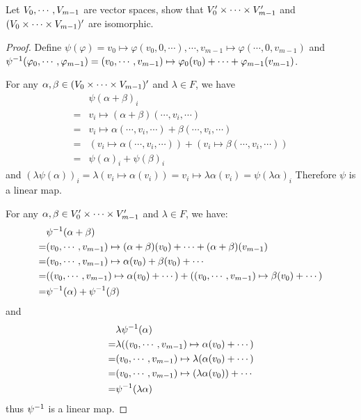 \documentclass[../main.tex]{subfiles}
\begin{document}
\begin{exercise}
  Let $V_0 , \cdots , V_{m - 1}$ are vector spaces, show that $V^\prime_0 \times \cdots \times V^\prime_{m - 1}$ and
  $(V_0 \times \cdots \times V_{m - 1})^\prime$ are isomorphic.
\end{exercise}
\begin{proof}
  Define $\psi(\varphi) = v_0 \mapsto \varphi(v_0, 0, \cdots), \cdots, v_{m - 1} \mapsto \varphi(\cdots, 0, v_{m - 1})$
  and \\
  $\psi^{-1}(\varphi_0 , \cdots , \varphi_{m - 1}) = (v_0 , \cdots , v_{m - 1}) \mapsto \varphi_0(v_0) + \cdots + \varphi_{m - 1}(v_{m - 1})$.

  For any $\alpha, \beta \in (V_0 \times \cdots \times V_{m - 1})^\prime$ and $\lambda \in F$,
  we have
  \begin{align*}
     & \psi(\alpha + \beta)_i \\
    =& v_i \mapsto (\alpha + \beta)(\cdots, v_i, \cdots) \\
    =& v_i \mapsto \alpha(\cdots, v_i, \cdots) + \beta(\cdots, v_i, \cdots) \\
    =& (v_i \mapsto \alpha(\cdots, v_i, \cdots)) + (v_i \mapsto \beta(\cdots, v_i, \cdots)) \\
    =& \psi(\alpha)_i + \psi(\beta)_i
  \end{align*}
  and $(\lambda \psi(\alpha))_i = \lambda (v_i \mapsto \alpha(v_i)) = v_i \mapsto \lambda \alpha(v_i) = \psi(\lambda \alpha)_i$
  Therefore $\psi$ is a linear map.

  For any $\alpha, \beta \in V^\prime_0 \times \cdots \times V^\prime_{m - 1}$ and $\lambda \in F$,
  we have:
  \begin{align*}
   & \psi^{-1}(\alpha + \beta) \\
  =& (v_0 , \cdots , v_{m - 1}) \mapsto (\alpha + \beta)(v_0) + \cdots + (\alpha + \beta)(v_{m - 1}) \\
  =& (v_0 , \cdots , v_{m - 1}) \mapsto \alpha(v_0) + \beta(v_0) + \cdots \\
  =& ((v_0 , \cdots , v_{m - 1}) \mapsto \alpha(v_0) + \cdots) + ((v_0 , \cdots , v_{m - 1}) \mapsto \beta(v_0) + \cdots) \\
  =& \psi^{-1}(\alpha) + \psi^{-1}(\beta)
  \end{align*}
  and
  \begin{align*}
     & \lambda\psi^{-1}(\alpha) \\
    =& \lambda ((v_0 , \cdots , v_{m - 1}) \mapsto \alpha(v_0) + \cdots) \\
    =& (v_0 , \cdots , v_{m - 1}) \mapsto \lambda (\alpha(v_0) + \cdots) \\
    =& (v_0 , \cdots , v_{m - 1}) \mapsto (\lambda \alpha(v_0)) + \cdots \\
    =& \psi^{-1}(\lambda \alpha)
  \end{align*}
  thus $\psi^{-1}$ is a linear map.
  

\end{proof}
\end{document}
